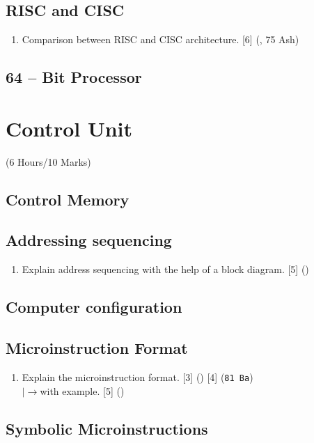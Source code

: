 \documentclass[12pt]{article}
\newcommand{\lb}{\\$\left|\rightarrow\right.$}
\begin{document}
	\subsection{RISC and CISC}
	\begin{enumerate}[noitemsep, topsep = 0pt]
		\item Comparison between RISC and CISC architecture. \hfill [6] (, 75 Ash)
	\end{enumerate}
	\subsection{64 – Bit Processor}

	\pagebreak
\section{Control Unit}
	\begin{center}(6 Hours/10 Marks)\end{center} 
	\subsection{Control Memory}
	
	\subsection{Addressing sequencing}
		\begin{enumerate}
			\item Explain address sequencing with the help of a block diagram. \hfill [5] ()
		\end{enumerate}			
	
	\subsection{Computer configuration}
	
	\subsection{Microinstruction Format}
		\begin{enumerate}[noitemsep, topsep=0pt]
			\item Explain the microinstruction format.  \hfill [3] () [4] (\texttt{81 Ba})
			\lb with example. \hfill [5] ()
		\end{enumerate}
		
	\subsection{Symbolic Microinstructions}
	
\end{document}
